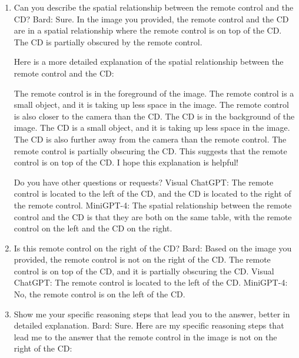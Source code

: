 \begin{enumerate}
    \item Can you describe the spatial relationship between the remote control and the CD?
    \subitem Bard: 
    Sure. In the image you provided, the remote control and the CD are in a spatial relationship where the remote control is on top of the CD. The CD is partially obscured by the remote control.
    
    Here is a more detailed explanation of the spatial relationship between the remote control and the CD:
    
    The remote control is in the foreground of the image. The remote control is a small object, and it is taking up less space in the image. The remote control is also closer to the camera than the CD.
    The CD is in the background of the image. The CD is a small object, and it is taking up less space in the image. The CD is also further away from the camera than the remote control.
    The remote control is partially obscuring the CD. This suggests that the remote control is on top of the CD.
    I hope this explanation is helpful!
    
    Do you have other questions or requests?
    \subitem Visual ChatGPT: The remote control is located to the left of the CD, and the CD is located to the right of the remote control.
    \subitem MiniGPT-4: The spatial relationship between the remote control and the CD is that they are both on the same table, with the remote control on the left and the CD on the right.
    \item Is this remote control on the right of the CD?
    \subitem Bard: Based on the image you provided, the remote control is not on the right of the CD. The remote control is on top of the CD, and it is partially obscuring the CD.
    \subitem Visual ChatGPT: The remote control is located to the left of the CD.
    \subitem MiniGPT-4: No, the remote control is on the left of the CD.
    \item Show me your specific reasoning steps that lead you to the answer, better in detailed explanation.
    \subitem Bard: 
    Sure. Here are my specific reasoning steps that lead me to the answer that the remote control in the image is not on the right of the CD:
    

\end{enumerate}
